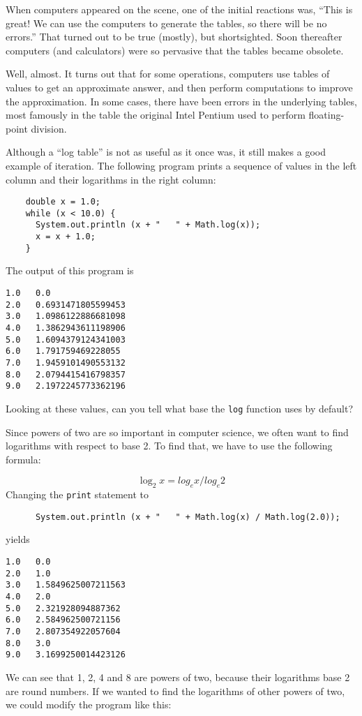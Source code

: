 \documentclass{book}
\begin{document}
When computers appeared on the scene, one of the initial reactions
was, ``This is great!  We can use the computers to generate the
tables, so there will be no errors.''  That turned out to be true
(mostly), but shortsighted.  Soon thereafter computers (and
calculators) were so pervasive that the tables became obsolete.

Well, almost.  It turns out that for some operations, computers
use tables of values to get an approximate answer, and then
perform computations to improve the approximation.  In some
cases, there have been errors in the underlying tables, most
famously in the table the original Intel Pentium used to perform
floating-point division.


Although a ``log table'' is not as useful as it once was, it still
makes a good example of iteration.  The following program prints a
sequence of values in the left column and their logarithms in the
right column:

\begin{verbatim}
    double x = 1.0;
    while (x < 10.0) {
      System.out.println (x + "   " + Math.log(x));
      x = x + 1.0;
    }
\end{verbatim}
%
The output of this program is

\begin{verbatim}
1.0   0.0
2.0   0.6931471805599453
3.0   1.0986122886681098
4.0   1.3862943611198906
5.0   1.6094379124341003
6.0   1.791759469228055
7.0   1.9459101490553132
8.0   2.0794415416798357
9.0   2.1972245773362196
\end{verbatim}
%
Looking at these values, can you tell what base the {\tt log}
function uses by default?

Since powers of two are so important
in computer science, we often want to find logarithms with
respect to base 2.  To find that, we have to use the following
formula:

\begin{equation}
\log_2 x = log_e x / log_e 2
\end{equation}
%
Changing the {\tt print} statement to

\begin{verbatim}
      System.out.println (x + "   " + Math.log(x) / Math.log(2.0));
\end{verbatim}
%
yields

\begin{verbatim}
1.0   0.0
2.0   1.0
3.0   1.5849625007211563
4.0   2.0
5.0   2.321928094887362
6.0   2.584962500721156
7.0   2.807354922057604
8.0   3.0
9.0   3.1699250014423126
\end{verbatim}
%
We can see that 1, 2, 4 and 8 are powers of two, because
their logarithms base 2 are round numbers.  If we wanted to find
the logarithms of other powers of two, we could modify the
program like this:
\end{document}
